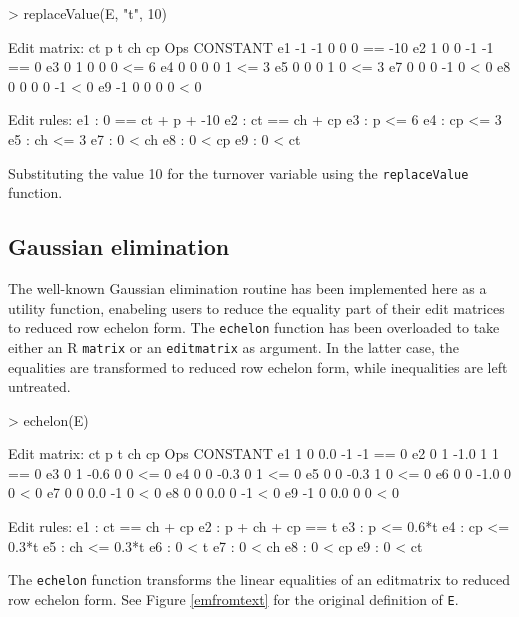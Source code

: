 \documentclass[10pt, fleqn, a4paper]{article}
\begin{document}
\begin{Rcode}
\begin{Schunk}
\begin{Sinput}
> replaceValue(E, "t", 10)
\end{Sinput}
\begin{Soutput}
Edit matrix:
   ct  p t ch cp Ops CONSTANT
e1 -1 -1 0  0  0  ==      -10
e2  1  0 0 -1 -1  ==        0
e3  0  1 0  0  0  <=        6
e4  0  0 0  0  1  <=        3
e5  0  0 0  1  0  <=        3
e7  0  0 0 -1  0   <        0
e8  0  0 0  0 -1   <        0
e9 -1  0 0  0  0   <        0

Edit rules:
e1 : 0 == ct + p + -10 
e2 : ct == ch + cp 
e3 : p <= 6 
e4 : cp <= 3 
e5 : ch <= 3 
e7 : 0 < ch 
e8 : 0 < cp 
e9 : 0 < ct  
\end{Soutput}
\end{Schunk}
\caption{Substituting the value 10 for the turnover variable using the {\tt replaceValue} function.}
\label{RreplaceValue}
\end{Rcode}


\subsection{Gaussian elimination}
The well-known Gaussian elimination routine has been implemented here as a utility function,
enabeling users to reduce the equality part of their edit matrices to reduced row echelon form.
The {\tt echelon} function has been overloaded to take either an R {\tt matrix} or an {\tt editmatrix}
as argument. In the latter case, the equalities are transformed to reduced row echelon form, while
inequalities are left untreated. 


\begin{Rcode}
\small
\begin{Schunk}
\begin{Sinput}
> echelon(E)
\end{Sinput}
\begin{Soutput}
Edit matrix:
   ct p    t ch cp Ops CONSTANT
e1  1 0  0.0 -1 -1  ==        0
e2  0 1 -1.0  1  1  ==        0
e3  0 1 -0.6  0  0  <=        0
e4  0 0 -0.3  0  1  <=        0
e5  0 0 -0.3  1  0  <=        0
e6  0 0 -1.0  0  0   <        0
e7  0 0  0.0 -1  0   <        0
e8  0 0  0.0  0 -1   <        0
e9 -1 0  0.0  0  0   <        0

Edit rules:
e1 : ct == ch + cp 
e2 : p + ch + cp == t 
e3 : p <= 0.6*t 
e4 : cp <= 0.3*t 
e5 : ch <= 0.3*t 
e6 : 0 < t 
e7 : 0 < ch 
e8 : 0 < cp 
e9 : 0 < ct  
\end{Soutput}
\end{Schunk}
\caption{The {\tt echelon} function transforms the linear equalities of an editmatrix to
reduced row echelon form. See Figure \ref{emfromtext} for the original definition of {\tt E}.}
\end{Rcode}
\end{document}
